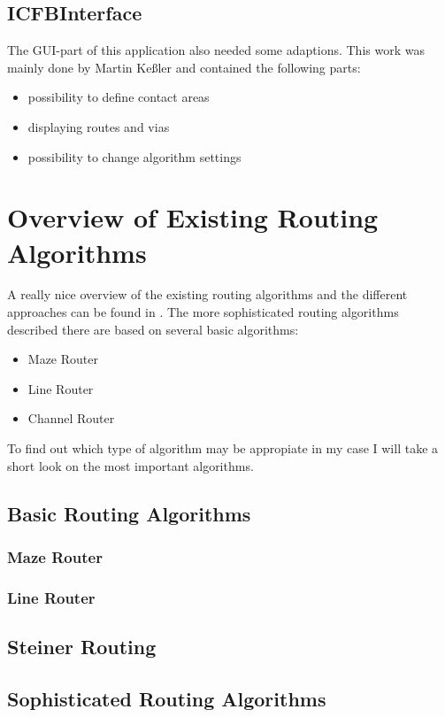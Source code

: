 \subsection{ICFBInterface}
The GUI-part of this application also needed some adaptions. This work was mainly done by Martin Keßler and contained the following parts:

\begin{itemize}
\item possibility to define contact areas
\item displaying routes and vias
\item possibility to change algorithm settings
\end{itemize}	

\section{Overview of Existing Routing Algorithms}
A really nice overview of the existing routing algorithms and the different approaches can be found in \cite[page 149 till 201]{springer:eda_analog_routing}. The more sophisticated routing algorithms described there are based on several basic algorithms:
\begin{itemize}
\item Maze Router
\item Line Router
\item Channel Router
\end{itemize}
To find out which type of algorithm may be appropiate in my case I will take a short look on the most important algorithms.

\subsection{Basic Routing Algorithms}
\subsubsection{Maze Router}

\subsubsection{Line Router}

\subsection{Steiner Routing}

\subsection{Sophisticated Routing Algorithms}


